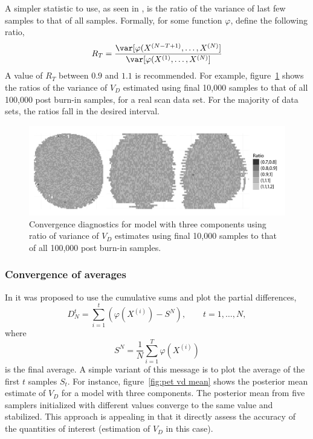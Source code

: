 A simpler statistic to use, as seen in \cite{Gelman:2011vx}, is the ratio of
the variance of last few samples to that of all samples. Formally, for some
function $\varphi$, define the following ratio,
\begin{equation}
  R_T = \frac{\var[\varphi(X^{(N-T+1)},\dots,X^{(N)}]}
  {\var[\varphi(X^{(1)},\dots,X^{(N)}]}
\end{equation}
A value of $R_T$ between $0.9$ and $1.1$ is recommended. For example,
figure~\ref{fig:pet diag ratio} shows the ratios of the variance of $V_D$
estimated using final 10,000 samples to that of all 100,000 post burn-in
samples, for a real \pet scan data set. For the majority of data sets, the
ratios fall in the desired interval.

\begin{figure}
  \includegraphics[width=\linewidth]{fig/PET_Converge}
  \caption{Convergence diagnostics for \pet model with three components using
    ratio of variance of $V_D$ estimates using final 10,000 samples to that of
    all 100,000 post burn-in samples.}
  \label{fig:pet diag ratio}
\end{figure}

\subsubsection{Convergence of averages}
\label{ssub:Convergence of averages}

In \cite{Yu:1998fn} it was proposed to use the cumulative sums and plot the
partial differences,
\begin{equation}
  D_N^t = \sum_{i=1}^t (\varphi(X^{(i)}) - S^N), \qquad t = 1,\dots,N,
\end{equation}
where
\begin{equation}
  S^N = \frac{1}{N}\sum_{i=1}^T \varphi(X^{(i)})
\end{equation}
is the final average. A simple variant of this message is to plot the average
of the first $t$ samples $S_t$. For instance, figure~\ref{fig:pet vd mean}
shows the posterior mean estimate of $V_D$ for a \pet model with three
components. The posterior mean from five samplers initialized with different
values converge to the same value and stabilized. This approach is appealing
in that it directly assess the accuracy of the quantities of interest
(estimation of $V_D$ in this case).

